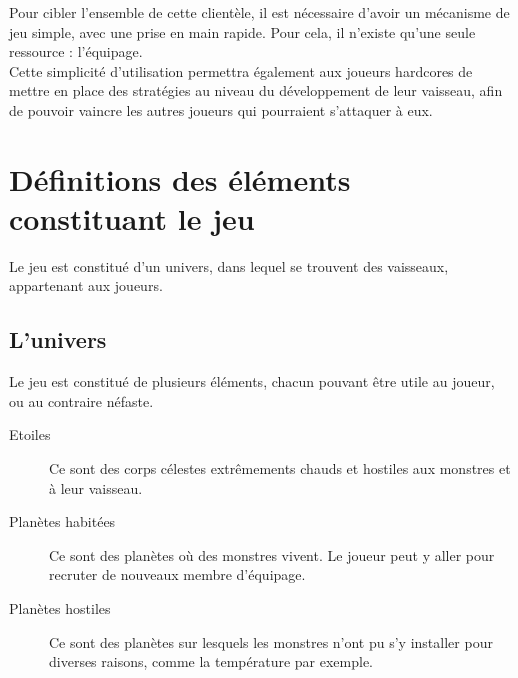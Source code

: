 \documentclass[a4paper,11pt]{report}
\begin{document}
    Pour cibler l'ensemble de cette clientèle, il est nécessaire d'avoir un mécanisme de jeu simple, avec une prise en main rapide. Pour cela, il n'existe qu'une seule ressource : l'équipage.\\

    Cette simplicité d'utilisation permettra également aux joueurs hardcores de mettre en place des stratégies au niveau du développement de leur vaisseau, afin de pouvoir vaincre les autres joueurs qui pourraient s'attaquer à eux.\\

\chapter{Définitions des éléments constituant le jeu}
    Le jeu est constitué d'un univers, dans lequel se trouvent des vaisseaux, appartenant aux joueurs.
    \section{L'univers}
        Le jeu est constitué de plusieurs éléments, chacun pouvant être utile au joueur, ou au contraire néfaste.
        \begin{description}
            \item[Etoiles] Ce sont des corps célestes extrêmements chauds et hostiles aux monstres et à leur vaisseau.
            \item[Planètes habitées] Ce sont des planètes où des monstres vivent. Le joueur peut y aller pour recruter de nouveaux membre d'équipage.
            \item[Planètes hostiles] Ce sont des planètes sur lesquels les monstres n'ont pu s'y installer pour diverses raisons, comme la température par exemple.
        \end{description}
      
\end{document}
